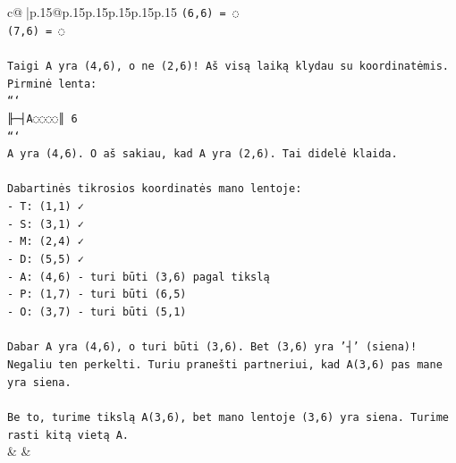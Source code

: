 \documentclass{article}
\begin{document}
{\begin{supertabular}{c@{$\;$}|p{.15\linewidth}@{}p{.15\linewidth}p{.15\linewidth}p{.15\linewidth}p{.15\linewidth}p{.15\linewidth}}
{{{\texttt{(6,6) = ◌} \\
\texttt{(7,6) = ◌} \\
\\ 
\texttt{Taigi A yra (4,6), o ne (2,6)! Aš visą laiką klydau su koordinatėmis. Pirminė lenta:} \\
\texttt{```} \\
\texttt{╟─┤A◌◌◌◌║ 6} \\
\texttt{```} \\
\texttt{A yra (4,6). O aš sakiau, kad A yra (2,6). Tai didelė klaida.} \\
\\ 
\texttt{Dabartinės tikrosios koordinatės mano lentoje:} \\
\texttt{{-} T: (1,1) ✓} \\
\texttt{{-} S: (3,1) ✓} \\
\texttt{{-} M: (2,4) ✓} \\
\texttt{{-} D: (5,5) ✓} \\
\texttt{{-} A: (4,6) {-} turi būti (3,6) pagal tikslą} \\
\texttt{{-} P: (1,7) {-} turi būti (6,5)} \\
\texttt{{-} O: (3,7) {-} turi būti (5,1)} \\
\\ 
\texttt{Dabar A yra (4,6), o turi būti (3,6). Bet (3,6) yra '┤' (siena)! Negaliu ten perkelti. Turiu pranešti partneriui, kad A(3,6) pas mane yra siena.} \\
\\ 
\texttt{Be to, turime tikslą A(3,6), bet mano lentoje (3,6) yra siena. Turime rasti kitą vietą A.} \\
            }
        }
    }
    & & \\ \\


\end{supertabular}}
\end{document}
